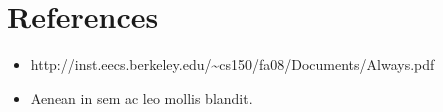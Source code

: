 \documentclass[a4paper,10pt]{article}
\theoremstyle{mytheor}
\begin{document}
\section*{References}
\begin{itemize}
  \small 
\item http://inst.eecs.berkeley.edu/{\textasciitilde}cs150/fa08/Documents/Always.pdf
\item Aenean in sem ac leo mollis blandit.  
\end{itemize}
\end{document}
